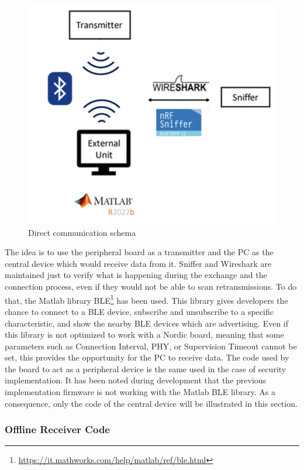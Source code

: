\documentclass{Configuration_Files/PoliMi3i_thesis}
\begin{document}
\begin{figure}[H]
    \centering
    \includegraphics[scale=0.6]{Board Windows PC/1.png}
    \caption{Direct communication schema}
    \label{boardwindows_1}
\end{figure}

The idea is to use the peripheral board as a transmitter and the PC as the central device which would receive data from it. Sniffer and Wireshark are maintained just to verify what is happening during the exchange and the connection process, even if they would not be able to scan retransmissions. To do that, the Matlab library BLE\footnote{\url{https://it.mathworks.com/help/matlab/ref/ble.html}} has been used. This library gives developers the chance to connect to a BLE device, subscribe and unsubscribe to a specific characteristic, and show the nearby BLE devices which are advertising. Even if this library is not optimized to work with a Nordic board, meaning that some parameters such as Connection Interval, PHY, or Supervision Timeout cannot be set, this provides the opportunity for the PC to receive data. The code used by the board to act as a peripheral device is the same used in the case of security implementation. It has been noted during development that the previous implementation firmware is not working with the Matlab BLE library. As a consequence, only the code of the central device will be illustrated in this section.

\subsubsection{Offline Receiver Code}
\end{document}
